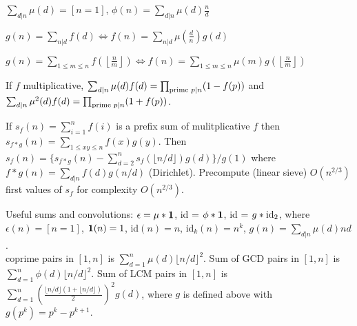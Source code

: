   $ \sum_{d | n} \mu(d) = [ n = 1] $,
  $ \phi(n) = \sum_{d | n} \mu(d)\frac{n}{d}$

  $ g(n) = \sum_{n|d} f(d) \Leftrightarrow f(n) = \sum_{n|d} \mu(\frac{d}{n})g(d)$

  $ g(n) = \sum_{1 \leq m \leq n} f(\left\lfloor\frac{n}{m}\right \rfloor ) \Leftrightarrow f(n) = \sum_{1\leq m\leq n} \mu(m)g(\left\lfloor\frac{n}{m}\right\rfloor)$

  If $f$ multiplicative, $\sum_{d | n} \mu(d)f(d) = \prod_{\textnormal{prime } p | n}(1 - f(p))$ and $\sum_{d | n}\mu^2(d)f(d) = \prod_{\textnormal{prime } p | n} (1 + f(p))$. 

  If $s_f(n) = \sum_{i = 1}^{n} f(i)$ is a prefix sum of mulitplicative $f$ then $s_{f * g}(n) = \sum_{1 \leq xy \leq n}f(x)g(y)$. Then $s_f(n) = \{s_{f * g}(n) - \sum_{d = 2}^{n} s_f(\lfloor n / d \rfloor) g(d)\} / g(1)$ where $f * g(n) = \sum_{d | n} f(d)g(n / d)$ (Dirichlet). Precompute (linear sieve) $O(n^{2/3})$ first values of $s_f$ for complexity $O(n^{2/3})$.

  Useful sums and convolutions: $\epsilon = \mu * \textnormal{\textbf{1}}$, id = $\phi * \textnormal{\textbf{1}}$, id = $g * \textnormal{id}_2$, where $\epsilon(n) = [n = 1]$, $\textnormal{\textbf{1}}(n) = 1$, id$(n) = n$, id$_k(n) = n^k$, $g(n) = \sum_{d | n}\mu(d)nd$.\\
  coprime pairs in $[1,n]$ is $\sum_{d = 1}^{n}\mu(d)\lfloor n / d \rfloor ^2$. Sum of GCD pairs in $[1, n]$ is $\sum_{d = 1}^{n}\phi(d)\lfloor n / d \rfloor ^2$. Sum of LCM pairs in $[1, n]$ is $\sum_{d = 1}^{n}(\frac{\lfloor n / d \rfloor (1 + \lfloor n / d \rfloor)}{2})^2 g(d)$, where $g$ is defined above with $g(p^k) = p^k - p^{k+1}$.


